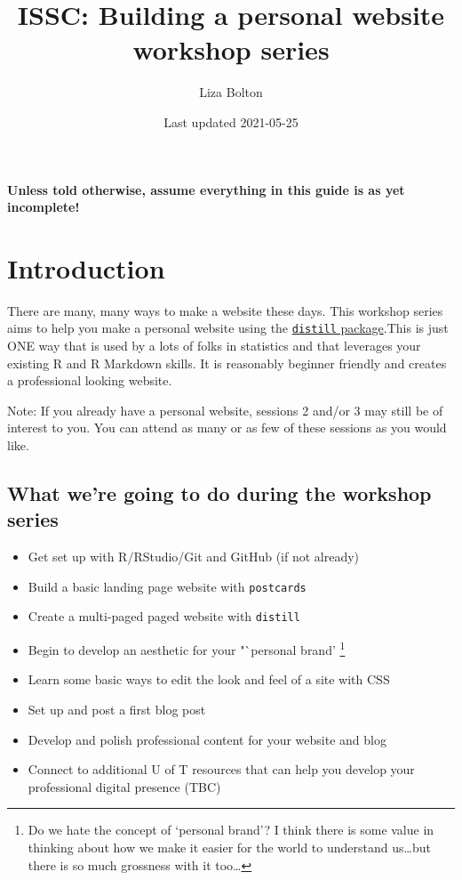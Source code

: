 \documentclass[
]{article}
\title{ISSC: Building a personal website workshop series}
\author{Liza Bolton}
\date{Last updated 2021-05-25}
\providecommand{\tightlist}{%
  \setlength{\itemsep}{0pt}\setlength{\parskip}{0pt}}
\begin{document}
\maketitle

{
\setcounter{tocdepth}{2}
\tableofcontents
}
\textbf{Unless told otherwise, assume everything in this guide is as yet incomplete!}

\hypertarget{introduction}{%
\section{Introduction}\label{introduction}}

There are many, many ways to make a website these days. This workshop series aims to help you make a personal website using the \href{https://rstudio.github.io/distill/}{\texttt{distill} package}.This is just ONE way that is used by a lots of folks in statistics and that leverages your existing R and R Markdown skills. It is reasonably beginner friendly and creates a professional looking website.

Note: If you already have a personal website, sessions 2 and/or 3 may still be of interest to you. You can attend as many or as few of these sessions as you would like.

\hypertarget{what-were-going-to-do-during-the-workshop-series}{%
\subsection{What we're going to do during the workshop series}\label{what-were-going-to-do-during-the-workshop-series}}

\begin{itemize}
\tightlist
\item
  Get set up with R/RStudio/Git and GitHub (if not already)
\item
  Build a basic landing page website with \texttt{postcards}
\item
  Create a multi-paged paged website with \texttt{distill}
\item
  Begin to develop an aesthetic for your "`personal brand' \footnote{Do we hate the concept of `personal brand'? I think there is some value in thinking about how we make it easier for the world to understand us\ldots but there is so much grossness with it too\ldots{}}
\item
  Learn some basic ways to edit the look and feel of a site with CSS
\item
  Set up and post a first blog post
\item
  Develop and polish professional content for your website and blog
\item
  Connect to additional U of T resources that can help you develop your professional digital presence (TBC)
\end{itemize}
\end{document}
